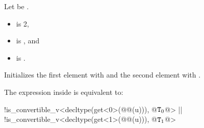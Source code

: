 \documentclass{wg21}
\begin{document}
\begin{itemdescr}
    \pnum
    Let  be .
    
    \pnum
    \constraints
    \begin{itemize}
        \item
         is 2,
        \item
         is , and
        \item
         is .
    \end{itemize}
    
    \pnum
    \effects
    Initializes the first element with  and
    the second element with .
    
    \pnum
    \remarks
    The expression inside  is equivalent to:
    \begin{codeblock}
        !is_convertible_v<decltype(get<0>(@@(u))), @$\texttt{T}_0$@> ||
        !is_convertible_v<decltype(get<1>(@@(u))), @$\texttt{T}_1$@>
    \end{codeblock}
\end{itemdescr}
\end{document}
